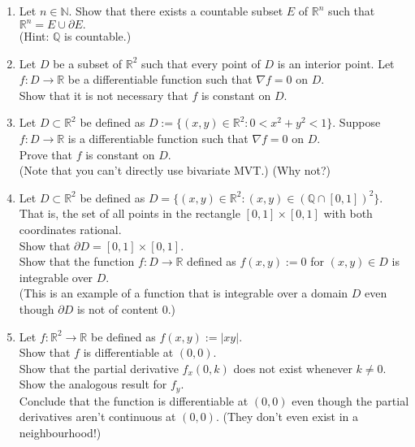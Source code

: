 \documentclass{article}
\begin{document}
\begin{enumerate}
	\item Let $n \in \mathbb{N}.$ Show that there exists a countable subset $E$ of $\mathbb{R}^n$ such that $\mathbb{R}^n = E \cup \partial E.$\\
	(Hint: $\mathbb{Q}$ is countable.)
	\item Let $D$ be a subset of $\mathbb{R}^2$ such that every point of $D$ is an interior point. Let $f : D \to \mathbb{R}$ be a differentiable function such that $\nabla f = 0$ on $D.$\\
	Show that it is not necessary that $f$ is constant on $D.$
	\item Let $D \subset \mathbb{R}^2$ be defined as $D := \{(x, y)\in\mathbb{R}^2 : 0 < x^2 + y^2 < 1\}.$ Suppose $f:D \to \mathbb{R}$ is a differentiable function such that $\nabla f = 0$ on $D.$\\
	Prove that $f$ is constant on $D.$ \\
	(Note that you can't directly use bivariate MVT.) \hfill (Why not?)
	\item Let $D \subset \mathbb{R}^2$ be defined as $D = \{(x, y) \in \mathbb{R}^2 : (x, y) \in (\mathbb{Q} \cap [0, 1])^2\}.$ That is, the set of all points in the rectangle $[0,1]\times[0,1]$ with both coordinates rational.\\
	Show that $\partial D = [0, 1]\times[0, 1].$\\
	Show that the function $f:D \to \mathbb{R}$ defined as $f(x, y) := 0$ for $(x, y) \in D$ is integrable over $D.$\\
	(This is an example of a function that is integrable over a domain $D$ even though $\partial D$ is not of content $0.$)
	\item Let $f:\mathbb{R}^2 \to \mathbb{R}$ be defined as $f(x, y) := |xy|.$\\
	Show that $f$ is differentiable at $(0, 0).$\\
	Show that the partial derivative $f_x(0, k)$ does not exist whenever $k \neq 0.$ Show the analogous result for $f_y.$\\
	Conclude that the function is differentiable at $(0, 0)$ even though the partial derivatives aren't continuous at $(0, 0).$ \hfill (They don't even exist in a neighbourhood!) 
\end{enumerate}
\end{document}
